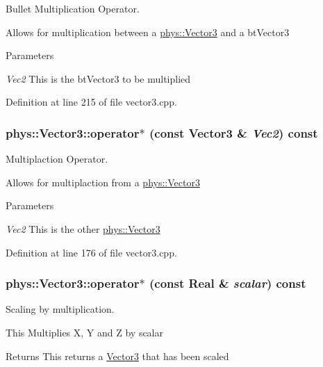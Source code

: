 Bullet Multiplication Operator. 

Allows for multiplication between a \hyperlink{classphys_1_1Vector3}{phys::Vector3} and a btVector3 
\begin{DoxyParams}{Parameters}
\item[{\em Vec2}]This is the btVector3 to be multiplied \end{DoxyParams}


Definition at line 215 of file vector3.cpp.

\hypertarget{classphys_1_1Vector3_aa148f18ae4cae10a4aae4170351d7c11}{
\subsubsection[{operator$\ast$}]{ phys::Vector3::operator$\ast$ (const {\bf Vector3} \& {\em Vec2}) const}}
\label{d5/d6a/classphys_1_1Vector3_aa148f18ae4cae10a4aae4170351d7c11}


Multiplaction Operator. 

Allows for multiplaction from a \hyperlink{classphys_1_1Vector3}{phys::Vector3} 
\begin{DoxyParams}{Parameters}
\item[{\em Vec2}]This is the other \hyperlink{classphys_1_1Vector3}{phys::Vector3} \end{DoxyParams}


Definition at line 176 of file vector3.cpp.

\hypertarget{classphys_1_1Vector3_ab9b40eb9eb73d806434550604e048faa}{
\subsubsection[{operator$\ast$}]{ phys::Vector3::operator$\ast$ (const {\bf Real} \& {\em scalar}) const}}
\label{d5/d6a/classphys_1_1Vector3_ab9b40eb9eb73d806434550604e048faa}


Scaling by multiplication. 

This Multiplies X, Y and Z by scalar \begin{DoxyReturn}{Returns}
This returns a \hyperlink{classphys_1_1Vector3}{Vector3} that has been scaled 
\end{DoxyReturn}


